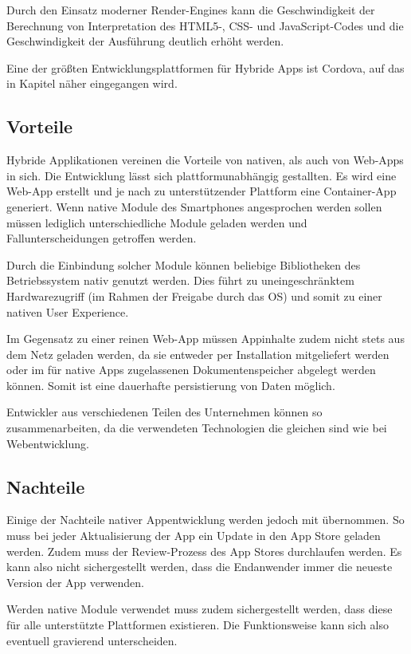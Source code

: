 Durch den Einsatz moderner Render-Engines kann die Geschwindigkeit der Berechnung von Interpretation des HTML5-, CSS- und JavaScript-Codes und die Geschwindigkeit der Ausführung deutlich erhöht werden. \cite{krausHybrid}

Eine der größten Entwicklungsplattformen für Hybride Apps ist Cordova, auf das in Kapitel  näher eingegangen wird.
%
\subsection{Vorteile}
Hybride Applikationen vereinen die Vorteile von nativen, als auch von Web-Apps in sich. Die Entwicklung lässt sich plattformunabhängig gestallten. Es wird eine Web-App erstellt und je nach zu unterstützender Plattform eine Container-App generiert. Wenn native Module des Smartphones angesprochen werden sollen müssen lediglich unterschiedliche Module geladen werden und Fallunterscheidungen getroffen werden.

Durch die Einbindung solcher Module können beliebige Bibliotheken des Betriebssystem nativ genutzt werden. Dies führt zu uneingeschränktem Hardwarezugriff (im Rahmen der Freigabe durch das OS) und somit zu einer nativen User Experience. 

Im Gegensatz zu einer reinen Web-App müssen Appinhalte zudem nicht stets aus dem Netz geladen werden, da sie entweder per Installation mitgeliefert werden oder im für native Apps zugelassenen Dokumentenspeicher abgelegt werden können. Somit ist eine dauerhafte persistierung von Daten möglich.

Entwickler aus verschiedenen Teilen des Unternehmen können so zusammenarbeiten, da die verwendeten Technologien die gleichen sind wie bei Webentwicklung. 
%
\subsection{Nachteile}
%
Einige der Nachteile nativer Appentwicklung werden jedoch mit übernommen. So muss bei jeder Aktualisierung der App ein Update in den App Store geladen werden. Zudem muss der Review-Prozess des App Stores durchlaufen werden. Es kann also nicht sichergestellt werden, dass die Endanwender immer die neueste Version der App verwenden. 

Werden native Module verwendet muss zudem sichergestellt werden, dass diese für alle unterstützte Plattformen existieren. Die Funktionsweise kann sich also eventuell gravierend unterscheiden.